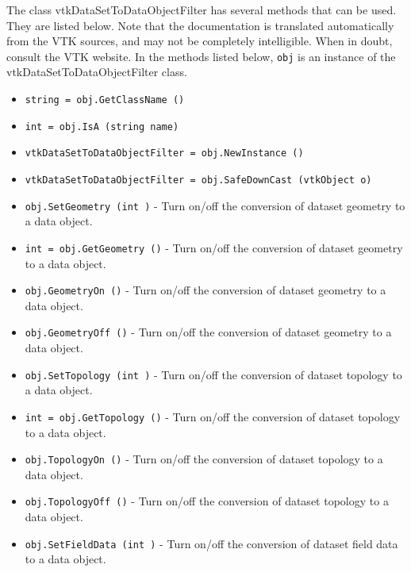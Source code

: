 The class vtkDataSetToDataObjectFilter has several methods that can be used.
  They are listed below.
Note that the documentation is translated automatically from the VTK sources,
and may not be completely intelligible.  When in doubt, consult the VTK website.
In the methods listed below, \verb|obj| is an instance of the vtkDataSetToDataObjectFilter class.
\begin{itemize}
\item  \verb|string = obj.GetClassName ()|

\item  \verb|int = obj.IsA (string name)|

\item  \verb|vtkDataSetToDataObjectFilter = obj.NewInstance ()|

\item  \verb|vtkDataSetToDataObjectFilter = obj.SafeDownCast (vtkObject o)|

\item  \verb|obj.SetGeometry (int )| -  Turn on/off the conversion of dataset geometry to a data object.

\item  \verb|int = obj.GetGeometry ()| -  Turn on/off the conversion of dataset geometry to a data object.

\item  \verb|obj.GeometryOn ()| -  Turn on/off the conversion of dataset geometry to a data object.

\item  \verb|obj.GeometryOff ()| -  Turn on/off the conversion of dataset geometry to a data object.

\item  \verb|obj.SetTopology (int )| -  Turn on/off the conversion of dataset topology to a data object.

\item  \verb|int = obj.GetTopology ()| -  Turn on/off the conversion of dataset topology to a data object.

\item  \verb|obj.TopologyOn ()| -  Turn on/off the conversion of dataset topology to a data object.

\item  \verb|obj.TopologyOff ()| -  Turn on/off the conversion of dataset topology to a data object.

\item  \verb|obj.SetFieldData (int )| -  Turn on/off the conversion of dataset field data to a data object.


\end{itemize}
